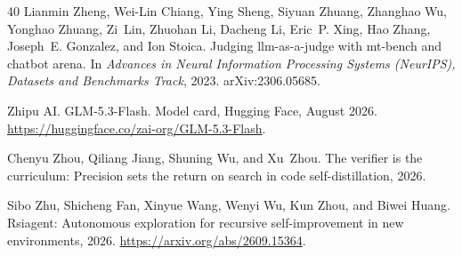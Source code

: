 \begin{thebibliography}{40}
Lianmin Zheng, Wei-Lin Chiang, Ying Sheng, Siyuan Zhuang, Zhanghao Wu, Yonghao Zhuang, Zi~Lin, Zhuohan Li, Dacheng Li, Eric~P. Xing, Hao Zhang, Joseph~E. Gonzalez, and Ion Stoica.
\newblock Judging llm-as-a-judge with mt-bench and chatbot arena.
\newblock In \emph{Advances in Neural Information Processing Systems (NeurIPS), Datasets and Benchmarks Track}, 2023. arXiv:2306.05685.

Zhipu AI.
\newblock GLM-5.3-Flash.
\newblock Model card, Hugging Face, August 2026. \url{https://huggingface.co/zai-org/GLM-5.3-Flash}.

Chenyu Zhou, Qiliang Jiang, Shuning Wu, and Xu~Zhou.
\newblock The verifier is the curriculum: Precision sets the return on search in code self-distillation, 2026.

Sibo Zhu, Shicheng Fan, Xinyue Wang, Wenyi Wu, Kun Zhou, and Biwei Huang.
\newblock Rsiagent: Autonomous exploration for recursive self-improvement in new environments, 2026.
\newblock \url{https://arxiv.org/abs/2609.15364}.

\end{thebibliography}
